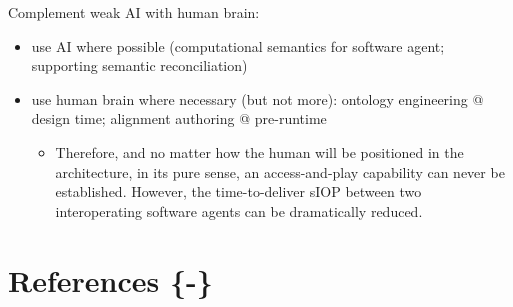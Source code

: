 \documentclass[sort&compress,preprint,authoryear,3p,twocolumn]{elsarticle}
\providecommand{\tightlist}{%
  \setlength{\itemsep}{0pt}\setlength{\parskip}{0pt}}
\begin{document}
Complement weak AI with human brain:

\begin{itemize}
\tightlist
\item
  use AI where possible (computational semantics for software agent;
  supporting semantic reconciliation)
\item
  use human brain where necessary (but not more): ontology engineering @
  design time; alignment authoring @ pre-runtime

  \begin{itemize}
  \tightlist
  \item
    Therefore, and no matter how the human will be positioned in the
    architecture, in its pure sense, an access-and-play capability can
    never be established. However, the time-to-deliver sIOP between two
    interoperating software agents can be dramatically reduced.
  \end{itemize}
\end{itemize}

\hypertarget{references--}{%
\section{References \{-\}}\label{references--}}

\setlength{\parindent}{-0.2in}

\setlength{\leftskip}{0.2in}

\setlength{\parskip}{8pt}



\end{document}
